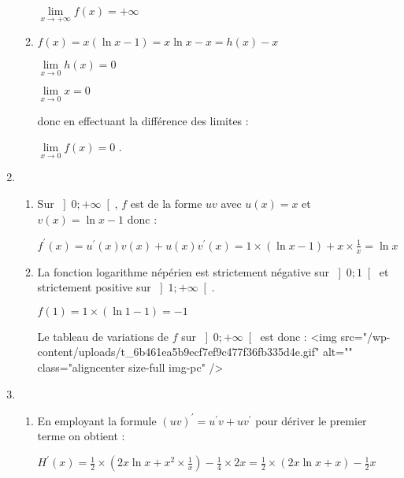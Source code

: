 \begin{corrige}
\begin{enumerate}
\begin{enumerate}[label=\alph*.]
               $\lim\limits_{x\rightarrow +\infty }f\left(x\right)=+\infty $
               \item
               $f\left(x\right)=x\left(\ln x-1\right)=x\ln x-x=h\left(x\right)-x$
               \par
               $\lim\limits_{x\rightarrow 0}h\left(x\right)=0$
               \par
               $\lim\limits_{x\rightarrow 0}x=0$
               \par
               donc en effectuant la différence des limites :
               \par
               $\lim\limits_{x\rightarrow 0}f\left(x\right)=0$
               .
          \end{enumerate}
          \item
          \begin{enumerate}[label=\alph*.]
               \item
               Sur $\left]0; +\infty \right[$, $f$ est de la forme $uv$ avec $u\left(x\right)=x$ et $v\left(x\right)=\ln x-1$ donc :
               \par
               $f^{\prime}\left(x\right)=u^{\prime}\left(x\right)v\left(x\right)+u\left(x\right)v^{\prime}\left(x\right)=1\times \left(\ln x-1\right)+x\times \frac{1}{x}=\ln x$
               \item
               La fonction logarithme népérien est strictement négative sur $\left]0; 1\right[$ et  strictement positive sur $\left]1; +\infty \right[$.
               \par
               $f\left(1\right)=1\times \left(\ln1-1\right)=-1$
               \par
               Le tableau de variations de $f$ sur $\left]0 ; +\infty \right[$ est donc :
               <img src="/wp-content/uploads/t_6b461ea5b9ecf7ef9c477f36fb335d4e.gif" alt="" class="aligncenter size-full  img-pc" />
          \end{enumerate}
          \item
          \begin{enumerate}[label=\alph*.]
               \item
               En employant la formule $\left(uv\right)^{\prime}=u^{\prime}v+uv^{\prime}$ pour dériver le premier terme on obtient :
               \par
               $H^{\prime}\left(x\right)=\frac{1}{2}\times \left(2x \ln x +x^{2}\times \frac{1}{x}\right)-\frac{1}{4}\times 2x=\frac{1}{2}\times \left(2x\ln x+x\right)-\frac{1}{2}x$

\end{enumerate}
\end{enumerate}
\end{corrige}
